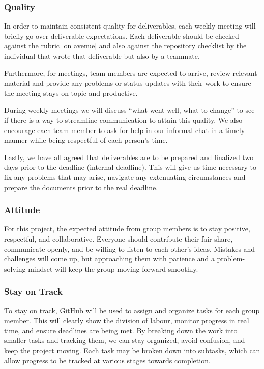 \documentclass{article}
\begin{document}
\subsubsection*{Quality} 

In order to maintain consistent quality for deliverables, each weekly meeting will briefly go over 
deliverable expectations. Each deliverable should be checked against the rubric [on avenue] and also against the repository checklist by the individual that wrote that deliverable but also by a teammate. 

Furthermore, for meetings, team members are expected to arrive, review relevant material and provide any problems or status updates with their work to ensure the meeting stays on-topic and productive.

During weekly meetings we will discuss “what went well, what to change” to see if there is a way to streamline communication to attain this quality. We also encourage each team member to ask for help in our informal chat in a timely manner while being respectful of each person's time.

Lastly, we have all agreed that deliverables are to be prepared and finalized two days prior to the deadline (internal deadline). This will give us time necessary to fix any problems that may arise, navigate any extenuating circumstances and prepare the documents prior to the real deadline.

\subsubsection*{Attitude}

For this project, the expected attitude from group members is to stay positive, respectful, and collaborative. Everyone should contribute their fair share, communicate openly, and be willing to listen to each other's ideas. Mistakes and challenges will come up, but approaching them with patience and a problem-solving mindset will keep the group moving forward smoothly.

\subsubsection*{Stay on Track}

To stay on track, GitHub will be used to assign and organize tasks for each group member. This will clearly show the division of labour, monitor progress in real time, and ensure deadlines are being met. By breaking down the work into smaller tasks and tracking them, we can stay organized, avoid confusion, and keep the project moving. Each task may be broken down into subtasks, which can allow progress to be tracked at various stages towards completion.  
\end{document}
